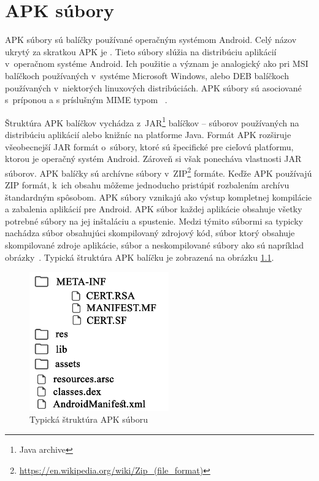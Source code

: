 \chapter{APK súbory}
\label{APKsubory}
APK súbory sú balíčky používané operačným systémom Android. Celý názov ukrytý za skratkou APK je . Tieto súbory slúžia na distribúciu aplikácií v~operačnom systéme Android. Ich použitie a význam je analogický ako pri MSI balíčkoch používaných v~systéme Microsoft Windows, alebo DEB balíčkoch používaných v~niektorých linuxových distribúciách. APK súbory sú asociované s~príponou  a s príslušným MIME typom ~\cite{Freed2016}.

Štruktúra APK balíčkov vychádza z~JAR\footnote{Java archive} balíčkov -- súborov používaných na distribúciu aplikácií alebo knižníc na platforme Java. Formát APK rozširuje všeobecnejší JAR formát o~súbory, ktoré sú špecifické pre cieľovú platformu, ktorou je operačný systém Android. Zároveň si však ponecháva vlastnosti JAR súborov. APK balíčky sú archívne súbory v~ZIP\footnote{\url{https://en.wikipedia.org/wiki/Zip\_(file_format)}} formáte.  Keďže APK používajú ZIP formát, k~ich obsahu môžeme jednoducho pristúpiť rozbalením archívu štandardným spôsobom.  APK súbory vznikajú ako výstup kompletnej kompilácie a zabalenia aplikácií pre Android. APK súbor každej aplikácie obsahuje všetky potrebné súbory na jej inštaláciu a spustenie. Medzi týmito súbormi sa typicky nachádza súbor  obsahujúci skompilovaný zdrojový kód, súbor  ktorý obsahuje skompilované zdroje aplikácie, súbor  a neskompilované súbory ako sú napríklad obrázky~\cite{buildingAndRunning}. Typická štruktúra APK balíčku je zobrazená na obrázku \ref{fig:strukturaApk}.
\begin{figure}[htb]
  \begin{center}
    \includegraphics[width=60mm]{images/apkStructure.pdf}
  \end{center}
  \caption{Typická štruktúra APK súboru}
  \label{fig:strukturaApk}
\end{figure}
